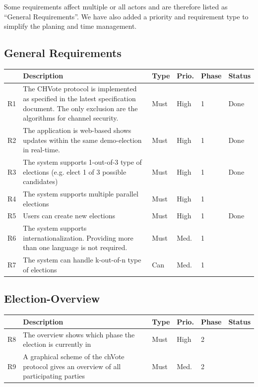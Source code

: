 Some requirements affect multiple or all actors and are therefore listed as "`General Requirements"'. We have also added a priority and requirement type to simplify the planing and time management.
\subsection{General Requirements}
\begin{longtable}{p{0.5cm}p{9cm}p{1cm}p{1cm}p{1cm}p{1cm}}
\hline
 & Description & Type & Prio. & Phase & Status\\
\hline
R1 & The CHVote protocol is implemented as specified in the latest specification document. The only exclusion are the algorithms for channel security. & Must & High & 1 & Done\\
R2 & The application is web-based shows updates within the same demo-election in real-time. & Must & High & 1 & Done\\
R3 & The system supports 1-out-of-3 type of elections (e.g. elect 1 of 3 possible candidates) & Must & High & 1 & Done\\
R4 & The system supports multiple parallel elections & Must & High & 1 & \\
R5 & Users can create new elections & Must & High & 1 & Done \\
R6 & The system supports internationalization. Providing more than one language is not required. & Must & Med. & 1 & \\
R7 & The system can handle k-out-of-n type of elections & Can & Med. & 1 & \\
\end{longtable}


\subsection{Election-Overview}
\begin{longtable}{p{0.5cm}p{9cm}p{1cm}p{1cm}p{1cm}p{1cm}}
\hline
 & Description & Type & Prio. & Phase & Status\\
\hline
R8 & The overview shows which phase the election is currently in & Must & High & 2 & \\
R9 & A graphical scheme of the chVote protocol gives an overview of all participating parties & Must & Med. & 2 & \\
\end{longtable}

